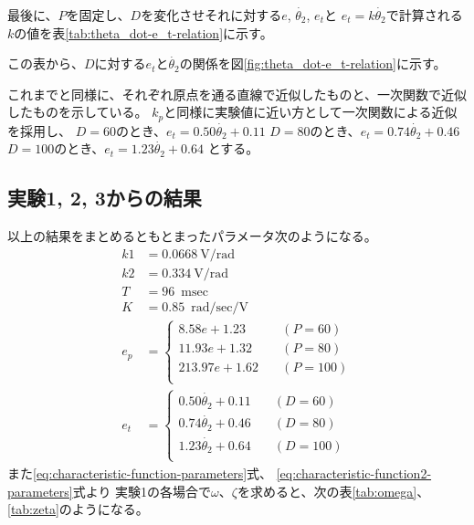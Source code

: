 \documentclass[../../../main]{subfiles}
\begin{document}
最後に、$P$を固定し、$D$を変化させそれに対する$e$, $\dot{\theta_2}$, $e_t$と
$e_t = k \dot{\theta_2}$で計算される$k$の値を表\ref{tab:theta_dot-e_t-relation}に示す。

この表から、$D$に対する$e_t$と$\dot{\theta_2}$の関係を図\ref{fig:theta_dot-e_t-relation}に示す。

これまでと同様に、それぞれ原点を通る直線で近似したものと、一次関数で近似したものを示している。
$k_p$と同様に実験値に近い方として一次関数による近似を採用し、
$D=60$のとき、$e_t = 0.50\dot{\theta_2} + 0.11$
$D=80$のとき、$e_t = 0.74\dot{\theta_2} + 0.46$
$D=100$のとき、$e_t = 1.23\dot{\theta_2} + 0.64$
とする。

\clearpage
\subsection{実験1, 2, 3からの結果}
以上の結果をまとめるともとまったパラメータ次のようになる。
\begin{equation}\label{eq:parameter-result}
    \begin{split}
        k1  & = \SI{0.0668}{\volt\per\radian}       \\
        k2  & = \SI{0.334}{\volt\per\radian}        \\
        T   & = \SI{96}{\milli\sec}                 \\
        K   & = \SI{0.85}{\radian\per\sec\per\volt} \\
        e_p & = \left\{
        \begin{alignedat}{3}
            8.58e + 1.23   & \quad (P=60)  \\
            11.93e + 1.32  & \quad (P=80)  \\
            213.97e + 1.62 & \quad (P=100) \\
        \end{alignedat}
        \right.                                     \\
        e_t & = \left\{
        \begin{alignedat}{3}
            0.50\dot{\theta_2} + 0.11 & \quad (D=60)  \\
            0.74\dot{\theta_2} + 0.46 & \quad (D=80)  \\
            1.23\dot{\theta_2} + 0.64 & \quad (D=100) \\
        \end{alignedat}
        \right.
    \end{split}
\end{equation}
また\ref{eq:characteristic-function-parameters}式、
\ref{eq:characteristic-function2-parameters}式より
実験1の各場合で$\omega$、$\zeta$を求めると、次の表\ref{tab:omega}、\ref{tab:zeta}のようになる。


\end{document}

